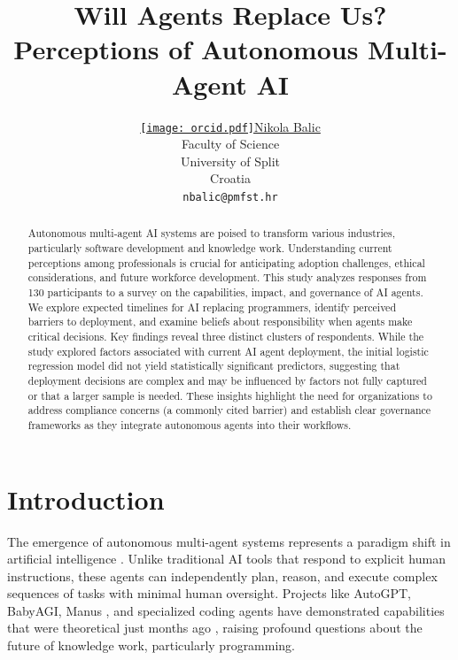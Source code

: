 \documentclass{article}
\title{Will Agents Replace Us? Perceptions of Autonomous Multi-Agent AI}
\author{ \href{https://orcid.org/0000-0002-4405-1470}{\texttt{[image: orcid.pdf]}\hspace{1mm}Nikola Balic} \\
	Faculty of Science\\
	University of Split\\
	Croatia \\
	\texttt{nbalic@pmfst.hr} \\
}
\begin{document}
\maketitle

\begin{abstract}
	Autonomous multi-agent AI systems are poised to transform various
	industries, particularly software development and knowledge work.
	Understanding current perceptions among professionals is crucial for
	anticipating adoption challenges, ethical considerations, and future
	workforce development. This study analyzes responses from 130
	participants to a survey on the capabilities, impact, and governance of
	AI agents. We explore expected timelines for AI replacing programmers,
	identify perceived barriers to deployment, and examine beliefs about
	responsibility when agents make critical decisions. Key findings reveal
	three distinct clusters of respondents. While the study explored factors
	associated with current AI agent deployment, the initial logistic regression model
	did not yield statistically significant predictors, suggesting that deployment decisions
	are complex and may be influenced by factors not fully captured or that a larger sample is needed.
	These insights highlight the need for
	organizations to address compliance concerns (a commonly cited barrier) and establish clear
	governance frameworks as they integrate autonomous agents into their
	workflows.
\end{abstract}




\section{Introduction}\label{introduction}

The emergence of autonomous multi-agent systems represents a paradigm shift in artificial intelligence \citep{Xi2023RisePotential}. Unlike traditional AI tools that respond to explicit human instructions, these agents can independently plan, reason, and execute complex sequences of tasks with minimal human oversight. Projects like AutoGPT, BabyAGI, Manus \citep{shen2025}, and specialized coding agents have demonstrated capabilities that were theoretical just months ago \citep{Liu2025AdvancesChallenges}, raising profound questions about the future of knowledge work, particularly programming.
\end{document}
